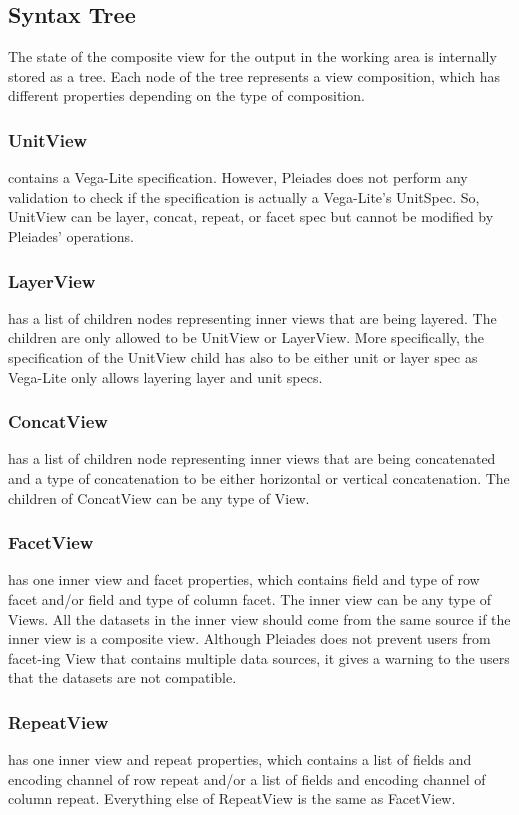 \documentclass[journal]{vgtc}                %
\begin{document}
\subsection{Syntax Tree}
The state of the composite view for the output in the working area is internally
stored as a tree. Each node of the tree represents a view composition, which has
different properties depending on the type of composition.

\subsubsection{UnitView} contains a Vega-Lite specification. However, Pleiades does
not perform any validation to check if the specification is actually a Vega-Lite’s
UnitSpec. So, UnitView can be layer, concat, repeat, or facet spec but cannot be
modified by Pleiades’ operations.

\subsubsection{LayerView} has a list of children nodes representing inner views that
are being layered. The children are only allowed to be UnitView or LayerView.
More specifically, the specification of the UnitView child has also to be either
unit or layer spec as Vega-Lite only allows layering layer and unit specs.

\subsubsection{ConcatView} has a list of children node representing inner views that
are being concatenated and a type of concatenation to be either horizontal or
vertical concatenation. The children of ConcatView can be any type of View.

\subsubsection{FacetView} has one inner view and facet properties, which contains
field and type of row facet and/or field and type of column facet. The inner
view can be any type of Views. All the datasets in the inner view should come
from the same source if the inner view is a composite view. Although Pleiades
does not prevent users from facet-ing View that contains multiple data sources,
it gives a warning to the users that the datasets are not compatible.

\subsubsection{RepeatView} has one inner view and repeat properties, which contains
a list of fields and encoding channel of row repeat and/or a list of fields and
encoding channel of column repeat. Everything else of RepeatView is the same as
FacetView.
\end{document}
